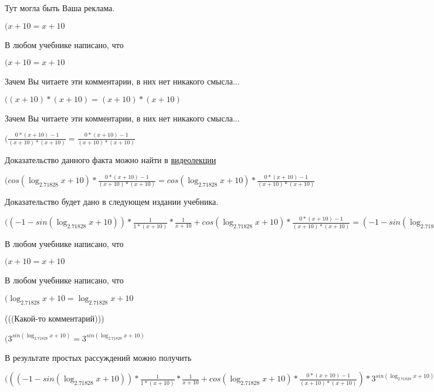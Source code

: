 \documentclass[12pt,a4paper,fleqn]{article}
\theoremstyle{definition}
\begin{document}
Тут могла быть Ваша реклама.

$( x  +  10  =  x  +  10 $

В любом учебнике написано, что

$( x  +  10  =  x  +  10 $

Зачем Вы читаете эти комментарии, в них нет никакого смысла...

$(( x  +  10 ) * ( x  +  10 ) = ( x  +  10 ) * ( x  +  10 )$

Зачем Вы читаете эти комментарии, в них нет никакого смысла...

$(\frac{ 0  * ( x  +  10 ) -  1 }{( x  +  10 ) * ( x  +  10 )}
 = \frac{ 0  * ( x  +  10 ) -  1 }{( x  +  10 ) * ( x  +  10 )}
$

Доказательство данного факта можно найти в \href{https://www.youtube.com/watch?v=dQw4w9WgXcQ}{видеолекции}

$(cos(\log_{ 2.71828 }{ x  +  10 }) * \frac{ 0  * ( x  +  10 ) -  1 }{( x  +  10 ) * ( x  +  10 )}
 = cos(\log_{ 2.71828 }{ x  +  10 }) * \frac{ 0  * ( x  +  10 ) -  1 }{( x  +  10 ) * ( x  +  10 )}
$

Доказательство будет дано в следующем издании учебника.

$(( -1  - sin(\log_{ 2.71828 }{ x  +  10 })) * \frac{ 1 }{ 1  * ( x  +  10 )}
 * \frac{ 1 }{ x  +  10 }
 + cos(\log_{ 2.71828 }{ x  +  10 }) * \frac{ 0  * ( x  +  10 ) -  1 }{( x  +  10 ) * ( x  +  10 )}
 = ( -1  - sin(\log_{ 2.71828 }{ x  +  10 })) * \frac{ 1 }{ 1  * ( x  +  10 )}
 * \frac{ 1 }{ x  +  10 }
 + cos(\log_{ 2.71828 }{ x  +  10 }) * \frac{ 0  * ( x  +  10 ) -  1 }{( x  +  10 ) * ( x  +  10 )}
$

В любом учебнике написано, что

$( x  +  10  =  x  +  10 $

В любом учебнике написано, что

$(\log_{ 2.71828 }{ x  +  10 } = \log_{ 2.71828 }{ x  +  10 }$

(((Какой-то комментарий)))

$({ 3 }^{sin(\log_{ 2.71828 }{ x  +  10 })} = { 3 }^{sin(\log_{ 2.71828 }{ x  +  10 })}$

В результате простых рассуждений можно получить

$((( -1  - sin(\log_{ 2.71828 }{ x  +  10 })) * \frac{ 1 }{ 1  * ( x  +  10 )}
 * \frac{ 1 }{ x  +  10 }
 + cos(\log_{ 2.71828 }{ x  +  10 }) * \frac{ 0  * ( x  +  10 ) -  1 }{( x  +  10 ) * ( x  +  10 )}
) * { 3 }^{sin(\log_{ 2.71828 }{ x  +  10 })} = (( -1  - sin(\log_{ 2.71828 }{ x  +  10 })) * \frac{ 1 }{ 1  * ( x  +  10 )}
 * \frac{ 1 }{ x  +  10 }
 + cos(\log_{ 2.71828 }{ x  +  10 }) * \frac{ 0  * ( x  +  10 ) -  1 }{( x  +  10 ) * ( x  +  10 )}
) * { 3 }^{sin(\log_{ 2.71828 }{ x  +  10 })}$
\end{document}
